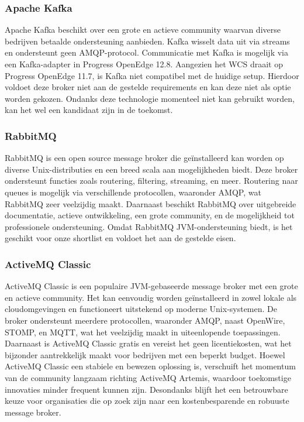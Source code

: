 \subsubsection{Apache Kafka}
Apache Kafka beschikt over een grote en actieve community waarvan diverse bedrijven betaalde ondersteuning aanbieden.
Kafka wisselt data uit via streams en ondersteunt geen AMQP-protocol. 
Communicatie met Kafka is mogelijk via een Kafka-adapter in Progress OpenEdge 12.8.
Aangezien het WCS draait op Progress OpenEdge 11.7, is Kafka niet compatibel met de huidige setup.
Hierdoor voldoet deze broker niet aan de gestelde requirements en kan deze niet als optie worden gekozen.
Ondanks deze technologie momenteel niet kan gebruikt worden, kan het wel een kandidaat zijn in de toekomst.

\subsubsection{RabbitMQ}
RabbitMQ is een open source message broker die geïnstalleerd kan worden op diverse Unix-distributies en een breed scala aan mogelijkheden biedt.
Deze broker ondersteunt functies zoals routering, filtering, streaming, en meer.
Routering naar queues is mogelijk via verschillende protocollen, waaronder AMQP, wat RabbitMQ zeer veelzijdig maakt.
Daarnaast beschikt RabbitMQ over uitgebreide documentatie, actieve ontwikkeling, een grote community, en de mogelijkheid tot professionele ondersteuning.
Omdat RabbitMQ JVM-ondersteuning biedt, is het geschikt voor onze shortlist en voldoet het aan de gestelde eisen.

\subsubsection{ActiveMQ Classic}
ActiveMQ Classic is een populaire JVM-gebaseerde message broker met een grote en actieve community.
Het kan eenvoudig worden geïnstalleerd in zowel lokale als cloudomgevingen en functioneert uitstekend op moderne Unix-systemen.
De broker ondersteunt meerdere protocollen, waaronder AMQP, naast OpenWire, STOMP, en MQTT, wat het veelzijdig maakt in uiteenlopende toepassingen.
Daarnaast is ActiveMQ Classic gratis en vereist het geen licentiekosten, wat het bijzonder aantrekkelijk maakt voor bedrijven met een beperkt budget.
Hoewel ActiveMQ Classic een stabiele en bewezen oplossing is, verschuift het momentum van de community langzaam richting ActiveMQ Artemis, 
waardoor toekomstige innovaties minder frequent kunnen zijn.
Desondanks blijft het een betrouwbare keuze voor organisaties die op zoek zijn naar een kostenbesparende en robuuste message broker.

